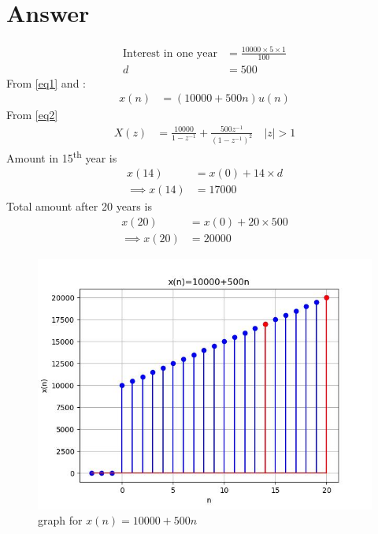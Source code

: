 \documentclass[journal,12pt,twocolumn]{IEEEtran}
\theoremstyle{remark}
\begin{document}
\section*{Answer}

\begin{align}
\text{Interest in one year} &= \frac{10000\times5\times1}{100}\\    
    d &= 500\label{eq1}
\end{align}
From \eqref{eq1} and :
    \begin{align}
	    x(n) &= (10000 + 500n)u(n)\label{eq2}
    \end{align}
From \eqref{eq2}
    \begin{align}
        X(z) &= \frac{10000}{1-z^{-1}} + \frac{500z^{-1}}{(1-z^{-1})^2} \quad |z|>1
    \end{align}
Amount in 15\textsuperscript{th} year is
    \begin{align}
        x(14) &= x(0) + 14\times d\\
        \implies x(14) &= 17000
    \end{align}
Total amount after 20 years is
    \begin{align}
        x(20) &= x(0) + 20\times 500\\
        \implies x(20) &= 20000
    \end{align}
    \begin{figure}[h]
    \renewcommand\thefigure{1}
        \centering
        \includegraphics[width=1\linewidth]{figs/p.jpeg}
        \caption{graph for $x(n) = 10000 + 500n$}
        \label{graph}
    \end{figure}
\end{document}
